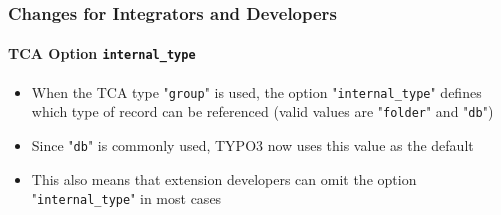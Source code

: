 %

\begin{frame}[fragile]
	\frametitle{Changes for Integrators and Developers}
	\framesubtitle{TCA Option \texttt{internal\_type}}

	\begin{itemize}
		\item When the TCA type "\texttt{group}" is used, the option
			"\texttt{internal\_type}" defines which type of record can be
			referenced\newline
			\small(valid values are "\texttt{folder}" and "\texttt{db}")\normalsize
		\item Since "\texttt{db}" is commonly used, TYPO3 now uses this value as
			the default
		\item This also means that extension developers can omit the option
			"\texttt{internal\_type}" in most cases
	\end{itemize}

\end{frame}

